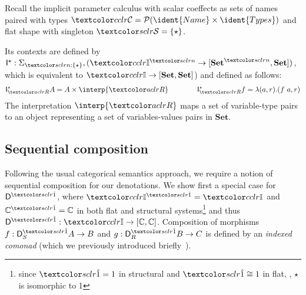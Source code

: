 \vspace{-2em}
\newcommand{\Imp}{\mathsf{I}}
\begin{example}
Recall the implicit parameter calculus with scalar coeffects as 
sets of names paired with types $\C = \mathcal{P}(\ident{Name} \times \ident{Types})$ 
and flat shape with singleton $\SH = {\{\sflat\}}$.
 
Its contexts are defined by 
$\Imp^\star :  \Sigma_{\sclrd{n} : \{\star\}}, (\Icat^{\sclrd{n}} \rightarrow [\mathbf{Set}^{\sclrd{n}}, \mathbf{Set}])$,
which is equivalent to $\Icat \rightarrow [\mathbf{Set}, \mathbf{Set}]$) and defined as follows:
\begin{align*}
\Imp^{\sflat}_{\aclrd{R}} A = A \times \interp{\aclrd{R}} \qquad\qquad
\Imp^{\sflat}_{\aclrd{R}} f = \lambda (a, r) . (f\ a, r)
\end{align*}
The interpretation $\interp{\aclrd{R}}$ maps a set of variable-type
pairs to an object representing a set of variables-values pairs in $\mathbf{Set}$.
\label{exm:impl1}
\end{example}

\subsection{Sequential composition}
\label{sem:seq}

Following the usual categorical semantics approach, we require a
notion of sequential composition for our denotations.  We show first a
special case for $\D^\sunit$, where $\Icat^\sunit = \Icat$
and $\mathbb{C}^\sunit = \mathbb{C}$ in both flat and structural
systems\footnote{since $\sunit = 1$ in structural and $\sunit \cong
  1$ in flat, \ie{}, $\star$ is isomorphic to 1} and thus $\D^\sunit :
\Icat \rightarrow [\mathbb{C}, \mathbb{C}]$. Composition of  
morphisms $f : \D^\sunit_S A \rightarrow B$ and $g : \D^\sunit_R B
\rightarrow C$ is defined by an \emph{indexed comonad}  
(which we previously introduced briefly~\cite{petricek2013coeffects}).

